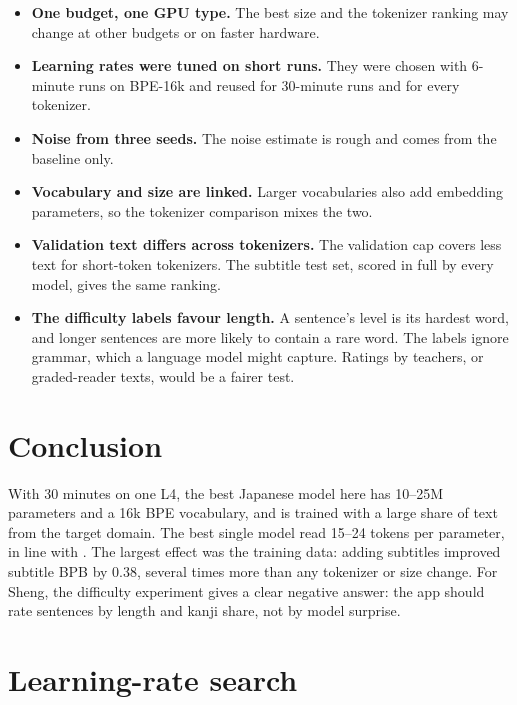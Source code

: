 \documentclass[11pt]{article}
\begin{document}
\begin{itemize}
\item \textbf{One budget, one GPU type.} The best size and the tokenizer ranking
may change at other budgets or on faster hardware.
\item \textbf{Learning rates were tuned on short runs.} They were chosen with
6-minute runs on BPE-16k and reused for 30-minute runs and for every tokenizer.
\item \textbf{Noise from three seeds.} The noise estimate is rough and comes from
the baseline only.
\item \textbf{Vocabulary and size are linked.} Larger vocabularies also add
embedding parameters, so the tokenizer comparison mixes the two.
\item \textbf{Validation text differs across tokenizers.} The validation cap
covers less text for short-token tokenizers. The subtitle test set, scored in
full by every model, gives the same ranking.
\item \textbf{The difficulty labels favour length.} A sentence's level is its
hardest word, and longer sentences are more likely to contain a rare word. The
labels ignore grammar, which a language model might capture. Ratings by
teachers, or graded-reader texts, would be a fairer test.
\end{itemize}

\section{Conclusion}

With 30 minutes on one L4, the best Japanese model here has 10--25M parameters
and a 16k BPE vocabulary, and is trained with a large share of text from the
target domain. The best single model read 15--24 tokens per parameter, in line
with \citet{hoffmann2022chinchilla}. The largest effect was the training data:
adding subtitles improved subtitle BPB by 0.38, several times more than any
tokenizer or size change. For Sheng, the difficulty
experiment gives a clear negative answer: the app should rate sentences by
length and kanji share, not by model surprise.




\appendix
\section{Learning-rate search}\label{app:lr}
\end{document}
